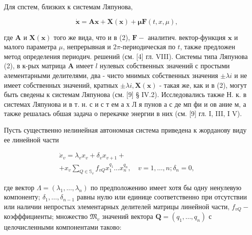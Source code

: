 \documentclass[10pt]{article}
\begin{document}
Для спстем, близких к системам Ляпунова,



\[

\dot{\boldsymbol{x}}=\boldsymbol{A} \boldsymbol{x}+\boldsymbol{X}(\boldsymbol{x})+\boldsymbol{\mu} \boldsymbol{F}(t, x, \mu),

\]



где $\boldsymbol{A}$ и $\boldsymbol{X}(\boldsymbol{x})$ того же вида, что и в (2), $\boldsymbol{F}-$ аналитич. вектор-функция $\boldsymbol{x}$ и малого параметра $\mu$, непрерывная и $2 \pi$-периодическая по $t$, также предложен метод определения периодич. решений (см. [4] гл. VIII). Системы типа Ляпунова (2), в к-рых матрица $\boldsymbol{A}$ имеет $l$ нулевых собственных значений с простыми әлементарными делителями, два - чисто мнимых собственных значения $\pm \lambda i$ и не имеет собственных значений, кратных $\pm \lambda i, \boldsymbol{X}(\boldsymbol{x})$ - такая же, как и в (2), могут быть сведены к системам Ляпунова (см. [9] § IV.2). Исследовались также Н. к. в системах Ляпунова и в т. н. с и с т ем а х Л я пунов а с де мп фи и ов ание м, а также решалась обшая задача о перекачке энергии в них (см. [9] гл. I, III, I V).



Пусть существенно нелинейная автономная система приведена к жорданову виду ее линейной части



\[

\begin{gathered}

\dot{x}_{v}=\lambda_{v} x_{v}+\delta_{v} x_{v+1}+ \\

+x_{v} \sum_{Q \in \mathbb{S}_{v}} f_{v Q} x_{1}^{q_{1}} \ldots x_{n}^{q_{n}}, \quad v=1, \ldots, n ; \delta_{n}=0,

\end{gathered}

\]



где вектор $\Lambda=\left(\lambda_{1}, \ldots, \lambda_{n}\right)$ по предположению имеет хотя бы одну ненулевую компоненту; $\delta_{1}, \ldots, \delta_{n-1}$ равны нулю или единице соответственно при отсутствии или наличии непростых элементарных делителей матрицы линейной части, $f_{v Q}-$ коэфффициенты; множество $\mathfrak{M}_{v}$ значений вектора $\boldsymbol{Q}=\left(q_{1}, \ldots, q_{n}\right)$ с целочисленными компонентами таково:
\end{document}
